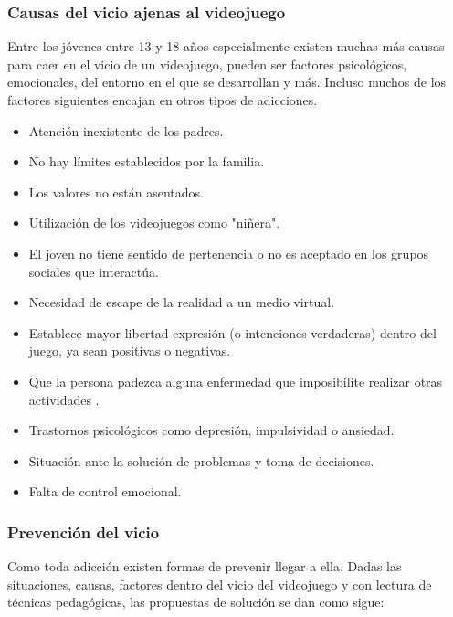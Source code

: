 \subsubsection{Causas del vicio ajenas al videojuego }
Entre los jóvenes entre 13 y 18 años especialmente existen muchas más causas para caer en el vicio de un videojuego, pueden ser factores psicológicos, emocionales, del entorno en el que se desarrollan y más. Incluso muchos de los factores siguientes encajan en otros tipos de adicciones.
\begin{itemize}
	\item Atención inexistente de los padres.
	\item No hay límites establecidos por la familia.
	\item Los valores no están asentados.
	\item Utilización de los videojuegos como "niñera".
	\item El joven no tiene sentido de pertenencia o no es aceptado en los grupos sociales que interactúa.
	\item Necesidad de escape de la realidad a un medio virtual.
	\item Establece mayor libertad expresión (o intenciones verdaderas) dentro del juego, ya sean positivas o negativas.
	\item Que la persona padezca alguna enfermedad que imposibilite realizar otras actividades .
	\item Trastornos psicológicos como depresión, impulsividad o ansiedad.
	\item Situación ante la solución de problemas y toma de decisiones.
	\item Falta de control emocional.
\end{itemize}

\subsubsection{Prevención del vicio}
Como toda adicción existen formas de prevenir llegar a ella.
Dadas las situaciones, causas, factores dentro del vicio del videojuego y con lectura de técnicas pedagógicas, las propuestas de solución se dan como sigue:

